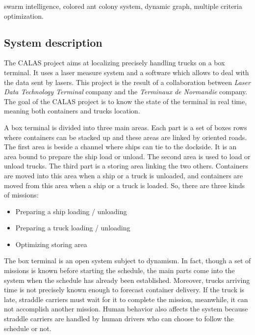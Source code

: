 \documentclass[a4paper,10pt]{article}
\begin{document}
 swarm intelligence, colored ant colony system, dynamic graph, multiple criteria optimization.
\begin{multicols}{2}
\section{System description}

The CALAS project aims at localizing precisely handling trucks on a box terminal. It uses a laser measure system and a software which allows to deal with the data sent by lasers. This project is the result of a collaboration between \textit{Laser Data Technology Terminal} company and the \textit{Terminaux de Normandie} company. The goal of the CALAS project is to know the state of the terminal in real time, meaning both containers and trucks location.
	
A box terminal is divided into three main areas. Each part is a set of boxes rows where containers can be stacked up and these areas are linked by oriented roads. The first area is beside a channel where ships can tie to the dockside. It is an area bound to prepare the ship load or unload. The second area is used to load or unload trucks. The third part is a storing area linking the two others. Containers are moved into this area when a ship or a truck is unloaded, and containers are moved from this area when a ship or a truck is loaded. So, there are three kinds of missions:

\begin{itemize}
	\item Preparing a ship loading / unloading
	\item Preparing a truck loading / unloading
	\item Optimizing storing area
\end{itemize}
		
The box terminal is an open system subject to dynamism. In fact, though a set of missions is known before starting the schedule, the main parts come into the system when the schedule has already been established. Moreover, trucks arriving time is not precisely known enough to forecast container delivery. If the truck is late, straddle carriers must wait for it to complete the mission, meanwhile, it can not accomplish another mission. Human behavior also affects the system because straddle carriers are handled by human drivers who can choose to follow the schedule or not.


\end{multicols}
\end{document}
